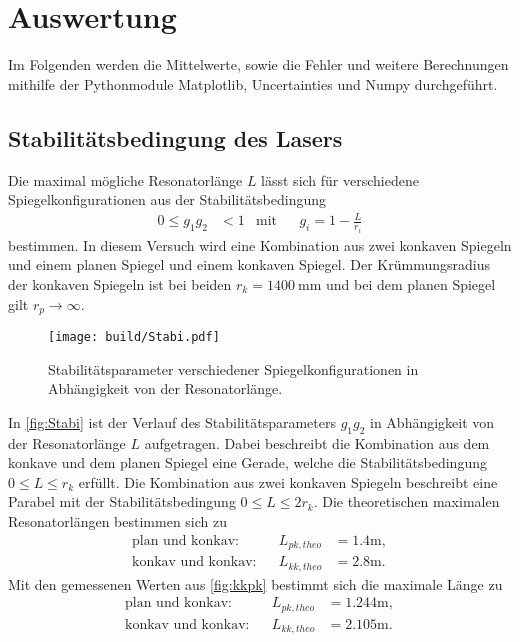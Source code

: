 \section{Auswertung}
\label{sec:Auswertung}

Im Folgenden werden die Mittelwerte, sowie die Fehler und weitere Berechnungen mithilfe der Pythonmodule Matplotlib\cite{matplotlib},
Uncertainties\cite{uncertainties} und Numpy\cite{numpy} durchgeführt.

\subsection{Stabilitätsbedingung des Lasers}
\label{subsec:Stabilitätsbedingung}
Die maximal mögliche Resonatorlänge $L$ lässt sich für verschiedene Spiegelkonfigurationen aus der Stabilitätsbedingung
\begin{align*}
  0 \leq g_1 g_2 &< 1 & \text{mit}& & g_i = 1 - \frac{L}{r_i}
\end{align*}
bestimmen. In diesem Versuch wird eine Kombination aus zwei konkaven Spiegeln und einem planen Spiegel und einem konkaven Spiegel.
Der Krümmungsradius der konkaven Spiegeln ist bei beiden $r_k = \qty{1400}{\milli\meter}$ und bei dem planen Spiegel gilt $r_p \to \infty$.

\begin{figure}[H]
  \centering
  \texttt{[image: build/Stabi.pdf]}
  \caption {Stabilitätsparameter verschiedener Spiegelkonfigurationen in Abhängigkeit von der Resonatorlänge.}
  \label{fig:Stabi}
\end{figure}

In \autoref{fig:Stabi} ist der Verlauf des Stabilitätsparameters $g_1 g_2$ in Abhängigkeit von der Resonatorlänge $L$ aufgetragen. Dabei beschreibt die
Kombination aus dem konkave und dem planen Spiegel eine Gerade, welche die Stabilitätsbedingung $0 \leq L \leq r_k$ erfüllt. Die Kombination aus zwei konkaven Spiegeln
beschreibt eine Parabel mit der Stabilitätsbedingung $0 \leq L \leq 2 r_k$.
Die theoretischen maximalen Resonatorlängen bestimmen sich zu
\begin{align}
  \text{plan und konkav:} && L_{pk,theo} &= 1.4 \si{\meter},\\
  \text{konkav und konkav:}&& L_{kk,theo} & = 2.8 \si{\meter}.
  \label{eqn:Länge_theo}
\end{align}
Mit den gemessenen Werten aus \autoref{fig:kkpk} bestimmt sich die maximale Länge zu
\begin{align}
  \text{plan und konkav:} && L_{pk,theo} &= 1.244 \si{\meter},\\
  \text{konkav und konkav:}&& L_{kk,theo} & = 2.105 \si{\meter}.
  \label{eqn:Länge_gem}
\end{align}

